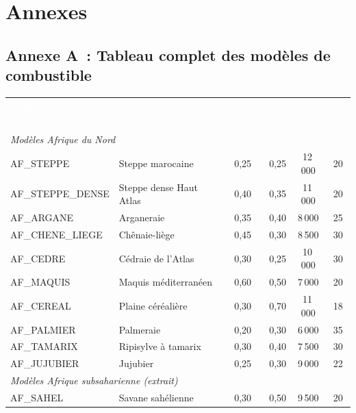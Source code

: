 \section{Annexes}

\subsection*{Annexe A~: Tableau complet des modèles de combustible}

\begin{small}
\begin{longtable}{|l|l|c|c|c|c|}
\hline
\rowcolor{NavyBlue} \textcolor{white}{\textbf{Code}} & \textcolor{white}{\textbf{Nom}} & \textcolor{white}{\textbf{$w_{1h}$}} & \textcolor{white}{\textbf{$\delta$}} & \textcolor{white}{\textbf{$\sigma_{1h}$}} & \textcolor{white}{\textbf{$m_x$}} \\
\rowcolor{NavyBlue}  & & \textcolor{white}{(kg/m²)} & \textcolor{white}{(m)} & \textcolor{white}{($\text{m}^{-1}$)} & \textcolor{white}{(\%)} \\
\hline
\endhead
\multicolumn{6}{l}{\textit{Modèles Afrique du Nord}} \\
\hline
AF\_STEPPE & Steppe marocaine & 0,25 & 0,25 & 12\,000 & 20 \\
AF\_STEPPE\_DENSE & Steppe dense Haut Atlas & 0,40 & 0,35 & 11\,000 & 20 \\
AF\_ARGANE & Arganeraie & 0,35 & 0,40 & 8\,000 & 25 \\
AF\_CHENE\_LIEGE & Chênaie-liège & 0,45 & 0,30 & 8\,500 & 30 \\
AF\_CEDRE & Cédraie de l'Atlas & 0,30 & 0,25 & 10\,000 & 30 \\
AF\_MAQUIS & Maquis méditerranéen & 0,60 & 0,50 & 7\,000 & 20 \\
AF\_CEREAL & Plaine céréalière & 0,30 & 0,70 & 11\,000 & 18 \\
AF\_PALMIER & Palmeraie & 0,20 & 0,30 & 6\,000 & 35 \\
AF\_TAMARIX & Ripisylve à tamarix & 0,30 & 0,40 & 7\,500 & 30 \\
AF\_JUJUBIER & Jujubier & 0,25 & 0,30 & 9\,000 & 22 \\
\hline
\multicolumn{6}{l}{\textit{Modèles Afrique subsaharienne (extrait)}} \\
\hline
AF\_SAHEL & Savane sahélienne & 0,30 & 0,50 & 9\,500 & 20 \\

\end{longtable}
\end{small}
